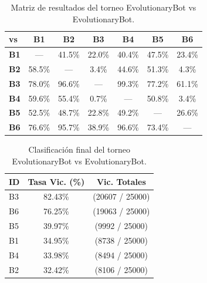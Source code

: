 \begin{table}[H]
	\centering
	\caption{Matriz de resultados del torneo EvolutionaryBot vs EvolutionaryBot.}
	\label{tab:coevo_benchmark_resultados}
	\begin{tabular}{@{}lcccccc@{}}
		\toprule
		\textbf{vs} & \textbf{B1} & \textbf{B2} & \textbf{B3} & \textbf{B4} & \textbf{B5} & \textbf{B6} \\
		\midrule
		\textbf{B1} & ---         & 41.5\%      & 22.0\%      & 40.4\%      & 47.5\%      & 23.4\%      \\
		\textbf{B2} & 58.5\%      & ---         & 3.4\%       & 44.6\%      & 51.3\%      & 4.3\%       \\
		\textbf{B3} & 78.0\%      & 96.6\%      & ---         & 99.3\%      & 77.2\%      & 61.1\%      \\
		\textbf{B4} & 59.6\%      & 55.4\%      & 0.7\%       & ---         & 50.8\%      & 3.4\%       \\
		\textbf{B5} & 52.5\%      & 48.7\%      & 22.8\%      & 49.2\%      & ---         & 26.6\%      \\
		\textbf{B6} & 76.6\%      & 95.7\%      & 38.9\%      & 96.6\%      & 73.4\%      & ---         \\
		\bottomrule
	\end{tabular}
\end{table}

\begin{table}[H]
	\centering
	\caption{Clasificación final del torneo EvolutionaryBot vs EvolutionaryBot.}
	\label{tab:coevo_ranking_final}
	\begin{tabular}{@{}lcc@{}}
		\toprule
		\textbf{ID} & \textbf{Tasa Vic. (\%)} & \textbf{Vic. Totales} \\
		\midrule
		B3          & 82.43\%                 & (20607 / 25000)       \\
		B6          & 76.25\%                 & (19063 / 25000)       \\
		B5          & 39.97\%                 & (9992 / 25000)        \\
		B1          & 34.95\%                 & (8738 / 25000)        \\
		B4          & 33.98\%                 & (8494 / 25000)        \\
		B2          & 32.42\%                 & (8106 / 25000)        \\
		\bottomrule
	\end{tabular}
\end{table}

